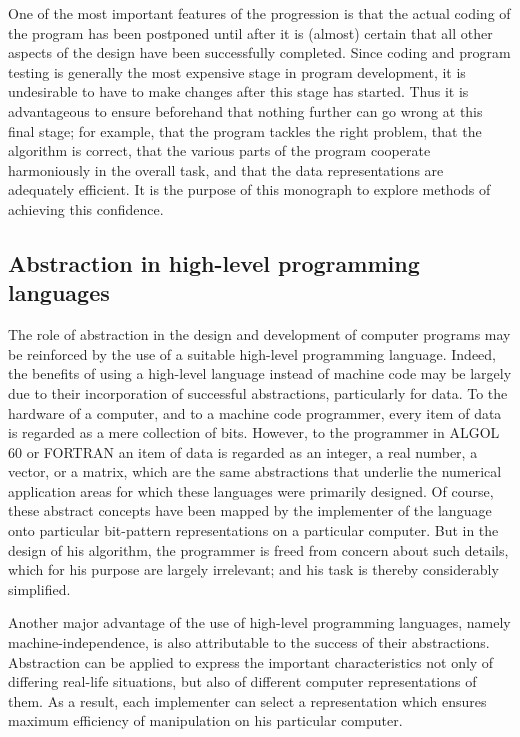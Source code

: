 One of the most important features of the progression is that the actual coding of the program has been postponed until after it is (almost) certain that all other aspects of the design have been successfully completed. Since coding and program testing is generally the most expensive stage in program development, it is undesirable to have to make changes after this stage has started. Thus it is advantageous to ensure beforehand that nothing further can go wrong at this final stage; for example, that the program tackles the right problem, that the algorithm is correct, that the various parts of the program cooperate harmoniously in the overall task, and that the data representations are adequately efficient. It is the purpose of this monograph to explore methods of achieving this confidence.

\subsection{Abstraction in high-level programming languages}

The role of abstraction in the design and development of computer programs may be reinforced by the use of a suitable high-level programming language. Indeed, the benefits of using a high-level language instead of machine code may be largely due to their incorporation of successful abstractions, particularly for data. To the hardware of a computer, and to a machine code programmer, every item of data is regarded as a mere collection of bits. However, to the programmer in ALGOL 60 or FORTRAN an item of data is regarded as an integer, a real number, a vector, or a matrix, which are the same abstractions that underlie the numerical application areas for which these languages were primarily designed. Of course, these abstract concepts have been mapped by the implementer of the language onto particular bit-pattern representations on a particular computer. But in the design of his algorithm, the programmer is freed from concern about such details, which for his purpose are largely irrelevant; and his task is thereby considerably simplified.

Another major advantage of the use of high-level programming languages, namely machine-independence, is also attributable to the success of their abstractions. Abstraction can be applied to express the important characteristics not only of differing real-life situations, but also of different computer representations of them. As a result, each implementer can select a representation which ensures maximum efficiency of manipulation on his particular computer.

